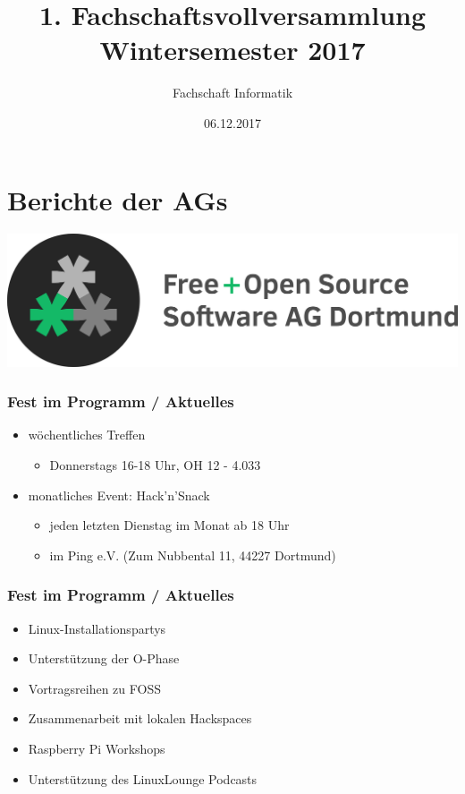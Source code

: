 \documentclass[xcolor=table]{beamer}
\title{1. Fachschaftsvollversammlung Wintersemester 2017}
\author{Fachschaft Informatik}
\date{06.12.2017}
\newcommand{\titleslide}[1]{
	\begin{frame}
		\huge #1 \normalfont
	\end{frame}
}
\begin{document}
\tudotitle

\section{Berichte der AGs}

\titleslide{\centering\includegraphics[scale=0.2]{res/logo_text-voll-transp.png}}

\begin{frame}
	\frametitle{Fest im Programm / Aktuelles}
	\begin{itemize}
		\item wöchentliches Treffen
			\begin{itemize}
				\item Donnerstags 16-18 Uhr, OH 12 - 4.033 
			\end{itemize}
		\item monatliches Event: Hack'n'Snack
		\begin{itemize}
			\item jeden letzten Dienstag im Monat ab 18 Uhr
			\item im Ping e.V. (Zum Nubbental 11, 44227 Dortmund)
		\end{itemize}
	\end{itemize}
\end{frame}

\begin{frame}
	\frametitle{Fest im Programm / Aktuelles}
	\begin{itemize}
		\item Linux-Installationspartys
		\item Unterstützung der O-Phase
		\item Vortragsreihen zu FOSS
		\item Zusammenarbeit mit lokalen Hackspaces
		\item Raspberry Pi Workshops
		\item Unterstützung des LinuxLounge Podcasts
	\end{itemize}
\end{frame}
\end{document}
